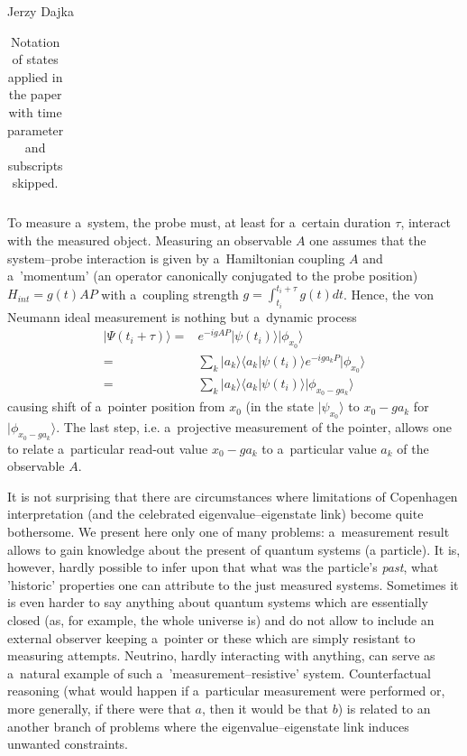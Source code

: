 \begin{artengenv}{Jerzy Dajka}
\begin{table}[ht]
\begin{tabular}{|l||l|}
\end{tabular}
\caption{\label{tabx} Notation of states applied in the paper with time parameter and subscripts skipped.}
\end{table}
  To measure a~system, the probe must, at least for a~certain duration $\tau$, interact with the measured object. Measuring an observable $A$ one assumes that the system--probe interaction is given by a~Hamiltonian coupling $A$ and a~'momentum' (an operator canonically conjugated to the  probe position) 
  \mbox{$H_{int}=g(t)AP$} with a~coupling strength $g=\int_{t_i}^{t_i+\tau} g(t)dt$. 
  Hence, the von Neumann ideal measurement is nothing but a~dynamic process 
  \begin{equation}
     \begin{split}\label{ideal}
            |\Psi(t_i+\tau)\rangle
            = &e^{-igAP}|\psi(t_i)\rangle|\phi_{x_0}\rangle\\
            = &\sum_k|a_k\rangle\langle a_k|\psi(t_i)\rangle e^{-iga_k P}|\phi_{x_0}\rangle\\
            = &\sum_k|a_k\rangle\langle a_k|\psi(t_i)\rangle|\phi_{x_0-ga_k}\rangle
     \end{split}
  \end{equation}
causing shift of a~pointer position from $x_0$ (in the state $|\psi_{x_0}\rangle$ to $x_0-ga_k$ for $|\phi_{x_0-ga_k}\rangle$. The last step, i.e. a~projective measurement of the pointer, allows one to relate a~particular  read-out value $x_0-ga_k$ to a~particular value $a_k$ of the observable $A$. 

It is not surprising that there are circumstances where  limitations of Copenhagen interpretation (and the celebrated eigenvalue--eigenstate link) become quite bothersome. We present here only one of many problems: 
a~measurement result allows to gain knowledge about the present of quantum systems (a particle). It is, however, hardly possible to infer upon that what was the particle's {\it past}, what 'historic' properties one can attribute to the just measured systems. Sometimes  it is even harder to say anything about  quantum systems which are essentially closed (as, for example, the whole universe is) and do not allow to include an external observer keeping a~pointer or these which are simply resistant to measuring attempts. Neutrino, hardly interacting with anything, can serve as a~natural example of such a~'measurement--resistive' system. Counterfactual reasoning  (what would happen if a~particular measurement were performed  or, more generally,  if there were that $a$, then it would be that $b$) is related to an another branch of problems where the eigenvalue--eigenstate link induces unwanted constraints. 


\end{artengenv}
